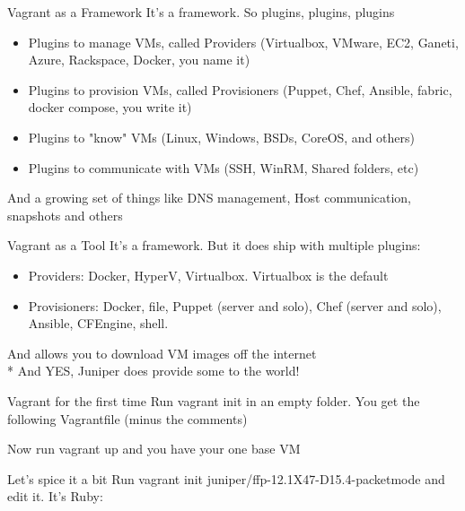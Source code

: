 \documentclass{beamer}
\begin{document}
    \begin{frame}{Vagrant as a Framework}
	    It's a framework. So plugins, plugins, plugins
        \begin{itemize}
		\pause \item Plugins to manage VMs, called Providers (Virtualbox, VMware, EC2, Ganeti, Azure, Rackspace, Docker, you name it)
		\pause \item Plugins to provision VMs, called Provisioners (Puppet, Chef, Ansible, fabric, docker compose, you write it)
		\pause \item Plugins to "know" VMs (Linux, Windows, BSDs, CoreOS, and others)
		\pause \item Plugins to communicate with VMs (SSH, WinRM, Shared folders, etc)
        \end{itemize}
	And a growing set of things like DNS management, Host communication, snapshots and others
    \end{frame}

    \begin{frame}{Vagrant as a Tool}
	    It's a framework. But it does ship with multiple plugins:
        \begin{itemize}
		\pause \item Providers: Docker, HyperV, Virtualbox. Virtualbox is the default
		\pause \item Provisioners: Docker, file, Puppet (server and solo), Chef (server and solo), Ansible, CFEngine, shell.
        \end{itemize}
	\pause And allows you to download VM images off the internet
	\pause \\* And YES, Juniper does provide some to the world!
    \end{frame}

    \begin{frame}{Vagrant for the first time}
	    Run vagrant init in an empty folder. You get the following Vagrantfile (minus the comments)
	    
	    Now run vagrant up and you have your one base VM
    \end{frame}
    \begin{frame}{Let's spice it a bit}
	    Run vagrant init juniper/ffp-12.1X47-D15.4-packetmode and edit it. It's Ruby:
	    \small 
    \end{frame}
\end{document}

